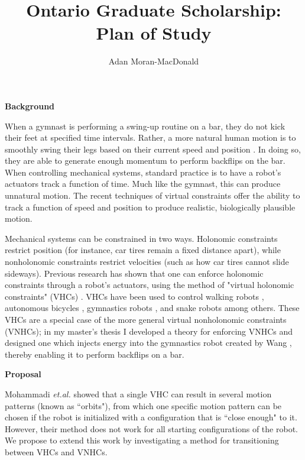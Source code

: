 \documentclass[a4paper,12pt]{article}
\begin{document}
\title{Ontario Graduate Scholarship: Plan of Study}
\author{Adan Moran-MacDonald}
\date{}
\maketitle

\begin{large}
\textbf{Background}
\end{large}

When a gymnast is performing a swing-up routine on a bar, they do not kick their
feet at specified time intervals. Rather, a more natural human motion is to
smoothly swing their legs based on their current speed and position
\cite{pendulum_length_giant_gymnastics}. In doing so, they are able to generate
enough momentum to perform backflips on the bar. When controlling mechanical
systems, standard practice is to have a robot's actuators track a function of
time. Much like the gymnast, this can produce unnatural motion.  The recent
techniques of virtual constraints offer the ability to track a function of speed
and position to produce realistic, biologically plausible motion.

Mechanical systems can be constrained in two ways. Holonomic constraints
restrict position (for instance, car tires remain a fixed distance apart), while
nonholonomic constraints restrict velocities (such as how car tires cannot
slide sideways). Previous research has shown that one can enforce holonomic
constraints through a robot's actuators, using the method of "virtual holonomic
constraints" (VHCs) \cite{vhcs_for_el_systems}. VHCs have been used to control
walking robots \cite{stable-walking}, autonomous bicycles \cite{bicycle},
gymnastics robots \cite{xingbo-thesis}, and snake robots \cite{snake-robot}
among others. These VHCs are a special case of the more general virtual
nonholonomic constraints (VNHCs); in my master's thesis \cite{my-thesis} I
developed a theory for enforcing VNHCs and designed one which injects energy
into the gymnastics robot created by Wang \cite{xingbo-thesis}, thereby enabling
it to perform backflips on a bar.

\begin{large} \textbf{Proposal} \end{large}

Mohammadi \textit{et.al.} \cite{manfredi-orbit-stabilization} showed that a
single VHC can result in several motion patterns (known as ``orbits"), from
which one specific motion pattern can be chosen if the robot is initialized with a
configuration that is ``close enough" to it. However, their method does not
work for all starting configurations of the robot. We propose to extend this
work by investigating a method for transitioning between VHCs and VNHCs.
\end{document}
